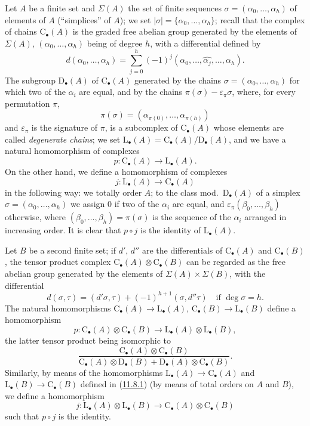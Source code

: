 \begin{env}[11.8.1]
\label{0.11.8.1}
Let $A$ be a finite set and $\Sigma(A)$ the set of finite sequences
$\sigma=(\alpha_0,\ldots,\alpha_h)$ of elements of $A$ (``simplices'' of
$A$); we set $|\sigma|=\{\alpha_0,\ldots,\alpha_h\}$; recall that the
complex of chains $\mathrm C_\bullet(A)$ is the graded free abelian group
generated by the elements of $\Sigma(A)$,
$(\alpha_0,\ldots,\alpha_h)$ being of degree $h$, with a differential
defined by
\[
d(\alpha_0,\ldots,\alpha_h)=
\sum_{j=0}^{h}(-1)^j
(\alpha_0,\ldots,\widehat{\alpha_j},\ldots,\alpha_h).
\]
The subgroup $\mathrm D_\bullet(A)$ of $\mathrm C_\bullet(A)$ generated by
the chains $\sigma=(\alpha_0,\ldots,\alpha_h)$ for which two of the
$\alpha_i$ are equal, and by the chains
$\pi(\sigma)-\varepsilon_\pi\sigma$, where, for every permutation $\pi$,
\[
\pi(\sigma)=(\alpha_{\pi(0)},\ldots,\alpha_{\pi(h)})
\]
and $\varepsilon_\pi$ is the signature of $\pi$, is a subcomplex of
$\mathrm C_\bullet(A)$ whose elements are called \emph{degenerate
chains}; we set
$\mathrm L_\bullet(A)=\mathrm C_\bullet(A)/\mathrm D_\bullet(A)$, and we have a
natural homomorphism of complexes
\[
p:\mathrm C_\bullet(A)\longrightarrow\mathrm L_\bullet(A).
\]
On the other hand, we define a homomorphism of complexes
\[
j:\mathrm L_\bullet(A)\longrightarrow\mathrm C_\bullet(A)
\]
in the following way: we totally order $A$; to the class
mod.~$\mathrm D_\bullet(A)$ of a simplex
$\sigma=(\alpha_0,\ldots,\alpha_h)$ we assign $0$ if two of the
$\alpha_i$ are equal, and $\varepsilon_\pi(\beta_0,\ldots,\beta_h)$ otherwise,
where $(\beta_0,\ldots,\beta_h)=\pi(\sigma)$ is the sequence of the $\alpha_i$
arranged in increasing order. It is clear that $p\circ
j$ is the identity of $\mathrm L_\bullet(A)$.
\end{env}

\begin{env}[11.8.2]
\label{0.11.8.2}
Let $B$ be a second finite set; if $d'$, $d''$ are the differentials of
$\mathrm C_\bullet(A)$ and $\mathrm C_\bullet(B)$, the tensor product
complex $\mathrm C_\bullet(A)\otimes\mathrm C_\bullet(B)$ can be
regarded as the free abelian group generated by the elements of
$\Sigma(A)\times\Sigma(B)$, with the differential
\[
d(\sigma,\tau)=(d'\sigma,\tau)+(-1)^{h+1}(\sigma,d''\tau)
\quad\text{if }\deg\sigma=h.
\]
The natural homomorphisms
$\mathrm C_\bullet(A)\to\mathrm L_\bullet(A)$,
$\mathrm C_\bullet(B)\to\mathrm L_\bullet(B)$ define a homomorphism
\[
p:\mathrm C_\bullet(A)\otimes\mathrm C_\bullet(B)
\longrightarrow\mathrm L_\bullet(A)\otimes\mathrm L_\bullet(B),
\]
the latter tensor product being isomorphic to
\[
\frac{\mathrm C_\bullet(A)\otimes\mathrm C_\bullet(B)}
{\mathrm C_\bullet(A)\otimes\mathrm D_\bullet(B)
+\mathrm D_\bullet(A)\otimes\mathrm C_\bullet(B)}.
\]
Similarly, by means of the homomorphisms
$\mathrm L_\bullet(A)\to\mathrm C_\bullet(A)$ and
$\mathrm L_\bullet(B)\to\mathrm C_\bullet(B)$ defined in
(\hyperref[0.11.8.1]{11.8.1}) (by means of total orders on $A$ and $B$),
we define a homomorphism
\[
j:\mathrm L_\bullet(A)\otimes\mathrm L_\bullet(B)
\longrightarrow\mathrm C_\bullet(A)\otimes\mathrm C_\bullet(B)
\]
such that $p\circ j$ is the identity.
\end{env}

